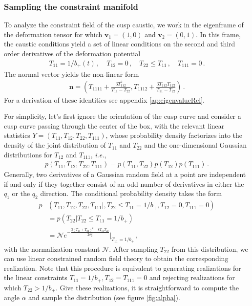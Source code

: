 \documentclass[a4paper, 11pt]{article}
\begin{document}
\subsubsection{Sampling the constraint manifold}
To analyze the constraint field of the cusp caustic, we work in the eigenframe of the deformation tensor for which $\bm{v}_1=(1,0)$ and $\bm{v}_2=(0,1)$. In this frame, the caustic conditions yield a set of linear conditions on the second and third order derivatives of the deformation potential
\begin{align}
T_{11}=1/b_+(t)\,, \quad T_{12}=0\,,\quad T_{22}\leq T_{11}\,,\quad T_{111}=0\,.
\end{align}
The normal vector yields the non-linear form
\begin{align}
\bm{n}=\left(T_{1111} + \frac{3T_{112}^2}{T_{11}-T_{22}}, T_{1112} + \frac{3T_{112}T_{122}}{T_{11}-T_{22}}\right)\,.
\end{align}
For a derivation of these identities see appendix \ref{ap:eigenvalueRel}.

For simplicity, let's first ignore the orientation of the cusp curve and consider a cusp curve passing through the center of the box, with the relevant linear statistics $Y=(T_{11},T_{12},T_{22},T_{111})$, whose probability density factorizes into the density of the joint distribution of $T_{11}$ and $T_{22}$ and the one-dimensional Gaussian distributions for $T_{12}$ and $T_{111}$, \textit{i.e.},
\begin{align}
p(T_{11},T_{12},T_{22},T_{111}) = p(T_{11},T_{22})p(T_{12})p(T_{111})\,.
\end{align}
Generally, two derivatives of a Gaussian random field at a point are independent if and only if they together consist of an odd number of derivatives in either the $q_1$ or the $q_2$ direction. The conditional probability density takes the form
\begin{align}
p&(T_{11},T_{12},T_{22},T_{111}|,T_{22}\leq T_{11}=1/b_+,T_{12}=0,T_{111}=0) \\
&= p(T_{22}| T_{22} \leq T_{11}=1/b_+)\\
&= \mathcal{N} e^{-\frac{3(T_{11} + T_{22})^2 - 8 T_{11} T_{22}}{2 \sigma_2^2}}\big|_{T_{11}=1/b_+}\,,
\end{align}
with the normalization constant $\mathcal{N}$. After sampling $T_{22}$ from this distribution, we can use linear constrained random field theory to obtain the corresponding realization. Note that this procedure is equivalent to generating realizations for the linear constraints $T_{11}=1/b_+,T_{12}=T_{111}=0$ and rejecting realizations for which $T_{22} > 1/b_+$. Give these realizations, it is straightforward to compute the angle $\alpha$ and sample the distribution (see figure \ref{fig:alpha}).
\end{document}
